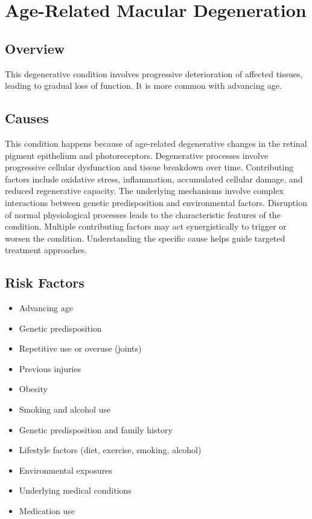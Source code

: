 \chapter{Age-Related Macular Degeneration}
\label{sec:Age-Related Macular Degeneration}

\section{Overview}
This degenerative condition involves progressive deterioration of affected tissues, leading to gradual loss of function. It is more common with advancing age.
\section{Causes}
This condition happens because of age-related degenerative changes in the retinal pigment epithelium and photoreceptors. Degenerative processes involve progressive cellular dysfunction and tissue breakdown over time. Contributing factors include oxidative stress, inflammation, accumulated cellular damage, and reduced regenerative capacity. The underlying mechanisms involve complex interactions between genetic predisposition and environmental factors. Disruption of normal physiological processes leads to the characteristic features of the condition. Multiple contributing factors may act synergistically to trigger or worsen the condition. Understanding the specific cause helps guide targeted treatment approaches.
\section{Risk Factors}


\begin{itemize}[noitemsep]
  \item Advancing age
  \item Genetic predisposition
  \item Repetitive use or overuse (joints)
  \item Previous injuries
  \item Obesity
  \item Smoking and alcohol use
  \item Genetic predisposition and family history
  \item Lifestyle factors (diet, exercise, smoking, alcohol)
  \item Environmental exposures
  \item Underlying medical conditions
  \item Medication use
\end{itemize}
